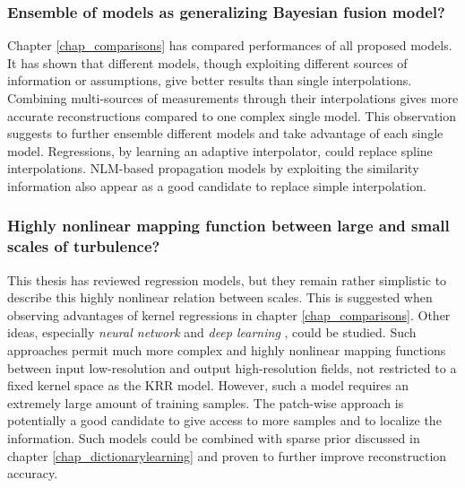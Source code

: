 \subsubsection*{Ensemble of models as generalizing Bayesian fusion model?} 
Chapter \ref{chap_comparisons} has compared performances of all proposed models. It has shown that different models, though exploiting different sources of information or assumptions, give better results than single interpolations. Combining multi-sources of measurements through their interpolations gives more accurate reconstructions compared to one complex single model. This observation suggests to further ensemble different models and take advantage of each single model. Regressions, by learning an adaptive interpolator, could replace spline interpolations. NLM-based propagation models by exploiting the similarity information also appear as a good candidate to replace simple interpolation. 

\subsubsection*{Highly nonlinear mapping function between large and small scales of turbulence?} This thesis has reviewed regression models, but they remain rather simplistic to describe this highly nonlinear relation between scales. This is suggested when observing advantages of kernel regressions in chapter \ref{chap_comparisons}. Other ideas, especially \textit{neural network} and \textit{deep learning} \citep{dong2014image}, could be studied. Such approaches permit much more complex and highly nonlinear mapping functions between input low-resolution and output high-resolution fields, not restricted to a fixed kernel space as the KRR model. However, such a model requires an extremely large amount of training samples. The patch-wise approach is potentially a good candidate to give access to more samples and to localize the information. Such models could be combined with sparse prior \citep{wang2015deep} discussed in chapter \ref{chap_dictionarylearning} and proven to further improve reconstruction accuracy. 

